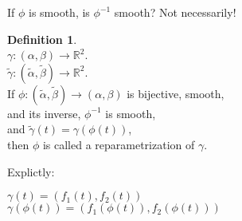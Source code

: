 \documentclass[twocolumn,20pt,fleqn]{extarticle}
\theoremstyle{plain}
\theoremstyle{definition}
\newtheorem*{definition}{Definition}
\theoremstyle{remark}
\begin{document}
If $\phi$ is smooth, is $\phi^{-1}$ smooth? Not necessarily!



\begin{definition}~\\
  $\gamma : (\alpha, \beta) \to \mathbb{R}^2$.\\
  $\tilde{\gamma} : (\tilde{\alpha}, \tilde{\beta}) \to \mathbb{R}^2$.\\
  If $\phi : (\tilde{\alpha}, \tilde{\beta})\to (\alpha, \beta)$ is bijective, smooth, \\and its inverse, $\phi^{-1}$ is smooth,\\ and
 $\tilde{\gamma}(t) = \gamma(\phi(t))$,\\ then $\phi$ is called a reparametrization of $\gamma$.
\end{definition}

Explictly:

$\gamma(t) = (f_1(t), f_2(t))$\\
$\gamma(\phi(t)) = (f_1(\phi(t)), f_2(\phi(t)))$



\newpage
\end{document}
